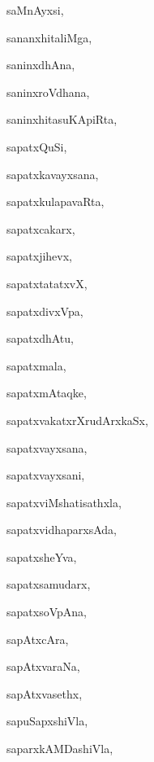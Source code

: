 \begin{multicols}{3}
{\noindent
{saMnAyxsi}, \pageref{saMnAyxsi}

\noindent
{sananxhitaliMga}, \pageref{sananxhitaliMga}

\noindent
{saninxdhAna}, \pageref{saninxdhAna}

\noindent
{saninxroVdhana}, \pageref{saninxroVdhana}

\noindent
{saninxhitasuKApiRta}, \pageref{saninxhitasuKApiRta}

\noindent
{sapatxQuSi}, \pageref{sapatxQuSi}

\noindent
{sapatxkavayxsana}, \pageref{sapatxkavayxsana}

\noindent
{sapatxkulapavaRta}, \pageref{sapatxkulapavaRta}

\noindent
{sapatxcakarx}, \pageref{sapatxcakarx}

\noindent
{sapatxjihevx}, \pageref{sapatxjihevx}

\noindent
{sapatxtatatxvX}, \pageref{sapatxtatatxvX}

\noindent
{sapatxdivxVpa}, \pageref{sapatxdivxVpa}

\noindent
{sapatxdhAtu}, \pageref{sapatxdhAtu}

\noindent
{sapatxmala}, \pageref{sapatxmala}

\noindent
{sapatxmAtaqke}, \pageref{sapatxmAtaqke1}

\noindent
{sapatxvakatxrXrudArxkaSx}, \pageref{sapatxvakatxrXrudArxkaSx}

\noindent
{sapatxvayxsana}, \pageref{sapatxvayxsana}

\noindent
{sapatxvayxsani}, \pageref{sapatxvayxsani}

\noindent
{sapatxviMshatisathxla}, \pageref{sapatxviMshatisathxla}

\noindent
{sapatxvidhaparxsAda}, \pageref{sapatxvidhaparxsAda}

\noindent
{sapatxsheYva}, \pageref{sapatxsheYva}

\noindent
{sapatxsamudarx}, \pageref{sapatxsamudarx}

\noindent
{sapatxsoVpAna}, \pageref{sapatxsoVpAna}

\noindent
{sapAtxcAra}, \pageref{sapAtxcAra}

\noindent
{sapAtxvaraNa}, \pageref{sapAtxvaraNa}

\noindent
{sapAtxvasethx}, \pageref{sapAtxvasethx}

\noindent
{sapuSapxshiVla}, \pageref{sapuSapxshiVla}

\noindent
{saparxkAMDashiVla}, \pageref{saparxkAMDashiVla}

}
\end{multicols}
